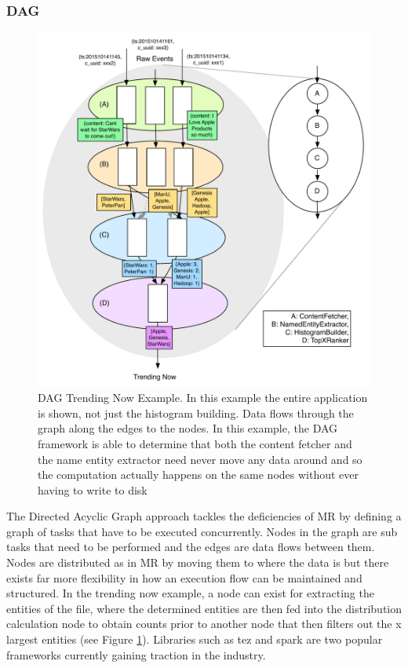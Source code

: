 \documentclass[a4paper,11pt]{scrreprt}
\begin{document}
\subsubsection{DAG}

\begin{figure}[H]
\centering
\includegraphics[scale=0.65] {DAG.pdf}
\caption{DAG Trending Now Example. In this example the entire application is shown, not just the histogram building. Data flows through the graph along the edges to the nodes. In this example, the DAG framework is able to determine that both the content fetcher and the name entity extractor need never move any data around and so the computation actually happens on the same nodes without ever having to write to disk}
\label{fig:DAGEx}
\end{figure}

The Directed Acyclic Graph\cite{dryad, spark-paper} approach tackles the deficiencies of MR by defining a graph of tasks that have to be executed concurrently. Nodes in the graph are sub tasks that need to be performed and the edges are data flows between them. Nodes are distributed as in MR by moving them to where the data is but there exists far more flexibility in how an execution flow can be maintained and structured. In the trending now example, a node can exist for extracting the entities of the file, where the determined entities are then fed into the distribution calculation node to obtain counts prior to another node that then filters out the x largest entities (see Figure \ref{fig:DAGEx}). Libraries such as tez\cite{tez-site} and spark\cite{spark-site} are two popular frameworks currently gaining traction in the industry.
\end{document}
